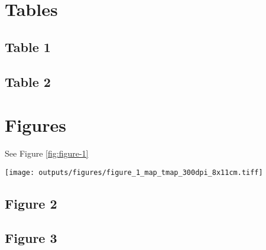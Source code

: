 \documentclass[
]{article}
\begin{document}
\clearpage

\newpage

\hypertarget{tables}{%
\section*{Tables}\label{tables}}

\hypertarget{table-1}{%
\subsection*{Table 1}\label{table-1}}

\clearpage

\newpage

\hypertarget{table-2}{%
\subsection*{Table 2}\label{table-2}}

\clearpage

\newpage

\hypertarget{figures}{%
\section*{Figures}\label{figures}}

See Figure \ref{fig:figure-1}

\texttt{[image: outputs/figures/figure\_1\_map\_tmap\_300dpi\_8x11cm.tiff]}

\clearpage

\newpage

\hypertarget{figure-2}{%
\subsection*{Figure 2}\label{figure-2}}

\clearpage

\newpage

\hypertarget{figure-3}{%
\subsection*{Figure 3}\label{figure-3}}

\clearpage

\newpage
\end{document}
